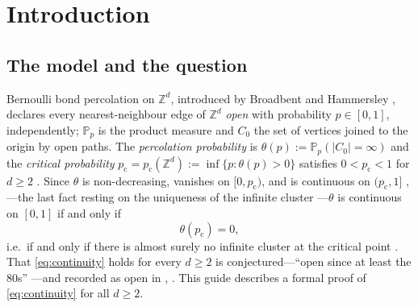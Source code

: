 \documentclass[11pt]{article}
\theoremstyle{definition}
\theoremstyle{remark}
\newcommand{\PP}{\mathbb{P}}
\newcommand{\Zd}{\mathbb{Z}^d}
\newcommand{\pc}{p_{\mathrm c}}
\begin{document}
\section{Introduction}\label{s:intro}

\subsection{The model and the question}\label{ss:model}
Bernoulli bond percolation on $\Zd$, introduced by Broadbent and Hammersley \citep{BroadbentHammersley1957}, declares every
nearest-neighbour edge of $\Zd$ \emph{open} with probability $p\in[0,1]$, independently; $\PP_p$ is the product measure and $C_0$ the
set of vertices joined to the origin by open paths.  The \emph{percolation probability} is $\theta(p):=\PP_p(|C_0|=\infty)$ and the
\emph{critical probability} $\pc=\pc(\Zd):=\inf\{p:\theta(p)>0\}$ satisfies $0<\pc<1$ for $d\ge2$
\citep[Theorem~(1.10)]{GrimmettPercolation1999}.  Since $\theta$ is non-decreasing, vanishes on $[0,\pc)$, and is continuous on
$(\pc,1]$ \citep{VandenBergKeane1984}, \citep[Theorem~(8.8)]{GrimmettPercolation1999}---the last fact resting on the uniqueness of the
infinite cluster \citep{AizenmanKestenNewmanCMP1987,BurtonKeane1989}---$\theta$ is continuous on $[0,1]$ if and only if
\begin{equation}\label{eq:continuity}
 \theta(\pc)=0,
\end{equation}
i.e.\ if and only if there is almost surely no infinite cluster at the critical point \citep[\S8.3]{GrimmettPercolation1999}.
That \eqref{eq:continuity} holds for every $d\ge2$ is conjectured---``open since at least the 80s'' \citep[p.~1]{KozmaNitzan2024}---and
recorded as open in \citep[pp.~14, 202--203]{GrimmettPercolation1999}, \citep[Conjecture~1]{DuminilCopin2018ICM}.  This guide describes a formal proof of \eqref{eq:continuity} for all $d\ge2$.
\end{document}
